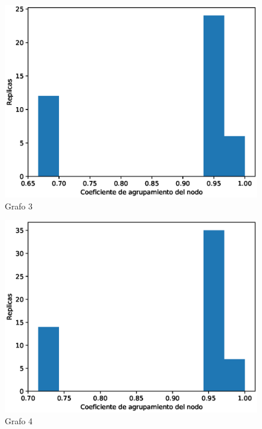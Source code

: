 \documentclass{article}
\begin{document}
\begin{figure}[H]
    \includegraphics[scale=0.6]{hist-grado-3}
    \caption{Grafo 3}
    \label{fig:matriz}
\end{figure}
\begin{figure}[H]
    \includegraphics[scale=0.6]{hist-grado-4}
    \caption{Grafo 4}
    \label{fig:matriz}
\end{figure}
\end{document}
